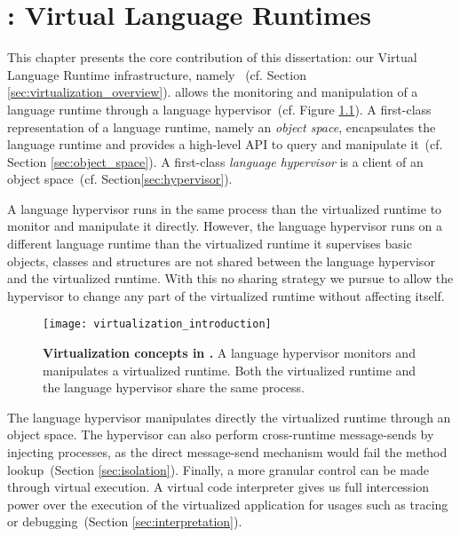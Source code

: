 

\chapter{\VTT: Virtual Language Runtimes}
\minitoc
\introduction

This chapter presents the core contribution of this dissertation: our Virtual Language Runtime infrastructure, namely \VTT~(cf. Section \ref{sec:virtualization_overview}). \VTT allows the monitoring and manipulation of a language runtime through a language hypervisor~(cf. Figure \ref{fig:virtualization_introduction}).
A first-class representation of a language runtime, namely an \emph{object space}, encapsulates the language runtime and provides a high-level API to query and manipulate it~(cf. Section \ref{sec:object_space}). A first-class \emph{language hypervisor} is a client of an object space~(cf. Section\ref{sec:hypervisor}).

A language hypervisor runs in the same process than the virtualized runtime to monitor and manipulate it directly. However, the language hypervisor runs on a different language runtime than the virtualized runtime it supervises \ie basic objects, classes and \VM structures are not shared between the language hypervisor and the virtualized runtime. With this no sharing strategy we pursue to allow the hypervisor to change any part of the virtualized runtime without affecting itself.

\begin{figure}[htb]
\begin{center}
\texttt{[image: virtualization\_introduction]}
\caption{\textbf{Virtualization concepts in \Vtt.} A language hypervisor monitors and manipulates a virtualized runtime. Both the virtualized runtime and the language hypervisor share the same process.\label{fig:virtualization_introduction}}
\end{center}
\end{figure}

The language hypervisor manipulates directly the virtualized runtime through an object space. The hypervisor can also perform cross-runtime message-sends by injecting processes, as the direct message-send \VM mechanism would fail the method lookup~(Section \ref{sec:isolation}).
Finally, a more granular control can be made through virtual execution. A virtual code interpreter gives us full intercession power over the execution of the virtualized application for usages such as tracing or debugging~(Section \ref{sec:interpretation}).

